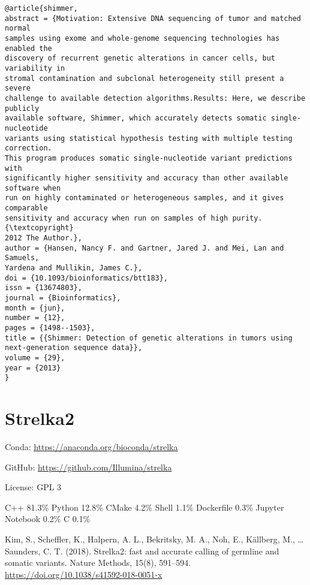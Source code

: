 \documentclass[]{article}
\begin{document}
\begin{verbatim}
@article{shimmer,
abstract = {Motivation: Extensive DNA sequencing of tumor and matched normal
samples using exome and whole-genome sequencing technologies has enabled the
discovery of recurrent genetic alterations in cancer cells, but variability in
stromal contamination and subclonal heterogeneity still present a severe
challenge to available detection algorithms.Results: Here, we describe publicly
available software, Shimmer, which accurately detects somatic single-nucleotide
variants using statistical hypothesis testing with multiple testing correction.
This program produces somatic single-nucleotide variant predictions with
significantly higher sensitivity and accuracy than other available software when
run on highly contaminated or heterogeneous samples, and it gives comparable
sensitivity and accuracy when run on samples of high purity. {\textcopyright}
2012 The Author.},
author = {Hansen, Nancy F. and Gartner, Jared J. and Mei, Lan and Samuels,
Yardena and Mullikin, James C.},
doi = {10.1093/bioinformatics/btt183},
issn = {13674803},
journal = {Bioinformatics},
month = {jun},
number = {12},
pages = {1498--1503},
title = {{Shimmer: Detection of genetic alterations in tumors using
next-generation sequence data}},
volume = {29},
year = {2013}
}
\end{verbatim}

\section{Strelka2}

Conda: \url{https://anaconda.org/bioconda/strelka}

GitHub: \url{https://github.com/Illumina/strelka}

License: GPL 3

C++ 81.3\% Python 12.8\% CMake 4.2\% Shell 1.1\% Dockerfile 0.3\% Jupyter Notebook 0.2\% C 0.1\%

Kim, S., Scheffler, K., Halpern, A. L., Bekritsky, M. A., Noh, E., Källberg, M., … Saunders, C. T. (2018). Strelka2: fast and accurate calling of germline and somatic variants. Nature Methods, 15(8), 591–594. \url{https://doi.org/10.1038/s41592-018-0051-x}
\end{document}
